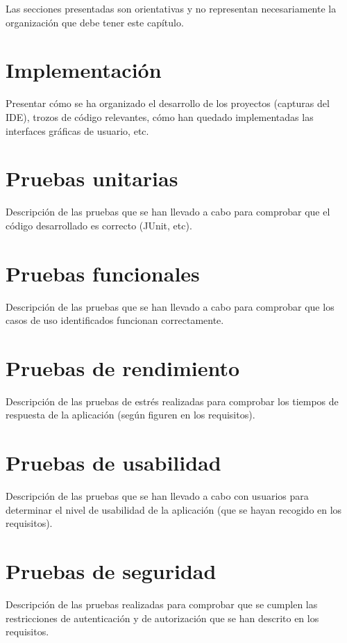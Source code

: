 Las secciones presentadas son orientativas y no representan
necesariamente la organización que debe tener este capítulo.
\section{Implementación}
Presentar cómo se ha organizado el desarrollo de los proyectos
(capturas del IDE), trozos de código relevantes, cómo han quedado
implementadas las interfaces gráficas de usuario, etc.
\section{Pruebas unitarias}
Descripción de las pruebas que se han llevado a cabo para comprobar que el código
desarrollado es correcto (JUnit, etc).
\section{Pruebas funcionales}
Descripción de las pruebas que se han llevado a cabo para comprobar que los casos de uso
identificados funcionan correctamente.
\section{Pruebas de rendimiento}
Descripción de las pruebas de estrés realizadas para comprobar los tiempos de
respuesta de la aplicación (según figuren en los requisitos).
\section{Pruebas de usabilidad}
Descripción de las pruebas que se han llevado a cabo con usuarios para determinar el
nivel de usabilidad de la aplicación (que se hayan recogido en los requisitos).
\section{Pruebas de seguridad}
Descripción de las pruebas realizadas para comprobar que se cumplen las
restricciones de autenticación y de autorización que se han descrito
en los requisitos.